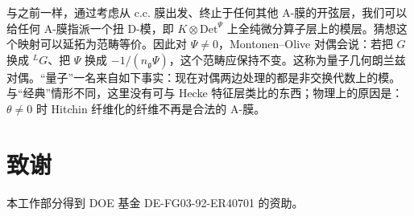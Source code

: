 \documentclass[11pt,a4paper,UTF8]{ctexart}
\begin{document}

与之前一样，通过考虑从 c.c. 膜出发、终止于任何其他 A-膜的开弦层，我们可以给任何 A-膜指派一个扭 D-模，即 $K\otimes\mathrm{Det}^{\Psi}$ 上全纯微分算子层上的模层。猜想这个映射可以延拓为范畴等价。因此对 $\Psi\neq 0$，Montonen–Olive 对偶会说：若把 $G$ 换成 ${}^{L}G$、把 $\Psi$ 换成 $-1/(n_{\mathfrak{g}}\Psi)$，这个范畴应保持不变。这称为量子几何朗兰兹对偶。“量子”一名来自如下事实：现在对偶两边处理的都是非交换代数上的模。与“经典”情形不同，这里没有可与 Hecke 特征层类比的东西；物理上的原因是：$\theta\neq 0$ 时 Hitchin 纤维化的纤维不再是合法的 A-膜。



\section*{致谢}

本工作部分得到 DOE 基金 DE-FG03-92-ER40701 的资助。


\end{document}
